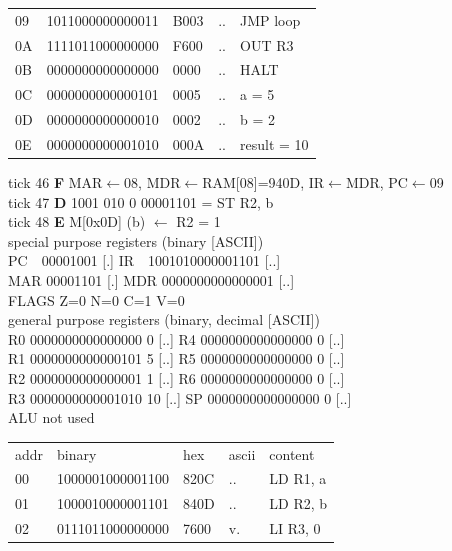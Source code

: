 \begin{tcolorbox}[stepbox, title={Instruction 15 \hfill ticks 43 to 45 \quad ADDI R2, R2, -1}]
{\begin{tabular}{@{}lllll@{}}
09 & 1011000000000011 & B003 & .. & JMP loop\\
0A & 1111011000000000 & F600 & .. & OUT R3\\
0B & 0000000000000000 & 0000 & .. & HALT\\
\rowcolor{datac}0C & 0000000000000101 & 0005 & .. & a = 5\\
\rowcolor{datac}0D & 0000000000000010 & 0002 & .. & b = 2\\
\rowcolor{datac}0E & 0000000000001010 & 000A & .. & result = 10\\
\end{tabular}}
\end{tcolorbox}\hfill\begin{tcolorbox}[stepbox, title={Instruction 16 \hfill ticks 46 to 48 \quad ST R2, b}]
\textcolor{dim}{tick 46} \textbf{F} MAR$\leftarrow$08, MDR$\leftarrow$RAM[08]=940D, IR$\leftarrow$MDR, PC$\leftarrow$09\\
\textcolor{dim}{tick 47} \textbf{D} 1001 010 0 00001101 = ST R2, b\\
\textcolor{dim}{tick 48} \textbf{E} M[0x0D] (b) $\leftarrow$ R2 = 1\\[2pt]
\textcolor{dim}{special purpose registers (binary [ASCII])}\\
PC~~00001001 [.] \hfill IR~~1001010000001101 [..]\\
MAR 00001101 [.] \hfill MDR 0000000000000001 [..]\\
FLAGS Z=0 N=0 C=1 V=0\\[2pt]
\textcolor{dim}{general purpose registers (binary, decimal [ASCII])}\\
R0 0000000000000000 0 [..] \hfill R4 0000000000000000 0 [..]\\
R1 0000000000000101 5 [..] \hfill R5 0000000000000000 0 [..]\\
R2 0000000000000001 1 [..] \hfill R6 0000000000000000 0 [..]\\
R3 0000000000001010 10 [..] \hfill SP 0000000000000000 0 [..]\\
\textcolor{dim}{ALU not used}\\[2pt]
{\setlength{\tabcolsep}{2pt}\begin{tabular}{@{}lllll@{}}
\textcolor{dim}{addr} & \textcolor{dim}{binary} & \textcolor{dim}{hex} & \textcolor{dim}{ascii} & \textcolor{dim}{content}\\
00 & 1000001000001100 & 820C & .. & LD R1, a\\
01 & 1000010000001101 & 840D & .. & LD R2, b\\
02 & 0111011000000000 & 7600 & v. & LI R3, 0\\

\end{tabular}}
\end{tcolorbox}
